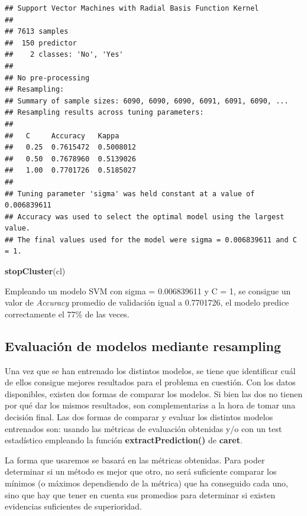 \documentclass[]{article}
\newenvironment{Shaded}{\begin{snugshade}}{\end{snugshade}}
\newcommand{\KeywordTok}[1]{\textcolor[rgb]{0.13,0.29,0.53}{\textbf{#1}}}
\newcommand{\NormalTok}[1]{#1}
\begin{document}
\begin{verbatim}
## Support Vector Machines with Radial Basis Function Kernel 
## 
## 7613 samples
##  150 predictor
##    2 classes: 'No', 'Yes' 
## 
## No pre-processing
## Resampling: 
## Summary of sample sizes: 6090, 6090, 6090, 6091, 6091, 6090, ... 
## Resampling results across tuning parameters:
## 
##   C     Accuracy   Kappa    
##   0.25  0.7615472  0.5008012
##   0.50  0.7678960  0.5139026
##   1.00  0.7701726  0.5185027
## 
## Tuning parameter 'sigma' was held constant at a value of 0.006839611
## Accuracy was used to select the optimal model using the largest value.
## The final values used for the model were sigma = 0.006839611 and C = 1.
\end{verbatim}

\begin{Shaded}
\begin{Highlighting}[]
\KeywordTok{stopCluster}\NormalTok{(cl)}
\end{Highlighting}
\end{Shaded}

Empleando un modelo SVM con sigma = 0.006839611 y C = 1, se
consigue un valor de \emph{Accuracy} promedio de validación igual a 0.7701726, el
modelo predice correctamente el 77\% de las veces.

\hypertarget{evaluaciuxf3n-de-modelos-mediante-resampling}{%
\subsection{Evaluación de modelos mediante
resampling}\label{evaluaciuxf3n-de-modelos-mediante-resampling}}

Una vez que se han entrenado los distintos modelos, se tiene que
identificar cuál de ellos consigue mejores resultados para el problema
en cuestión. Con los datos disponibles, existen dos formas de comparar
los modelos. Si bien las dos no tienen por qué dar los mismos
resultados, son complementarias a la hora de tomar una decisión final.
Las dos formas de comparar y evaluar los distintos modelos entrenados
son: usando las métricas de evaluación obtenidas y/o con un test estadístico
 empleando la función \textbf{extractPrediction()} de \textbf{caret}.

La forma que usaremos se basará en las métricas obtenidas. Para poder determinar si un
método es mejor que otro, no será suficiente comparar los mínimos (o
máximos dependiendo de la métrica) que ha conseguido cada uno, sino que
hay que tener en cuenta sus promedios para determinar si existen
evidencias suficientes de superioridad.
\end{document}
